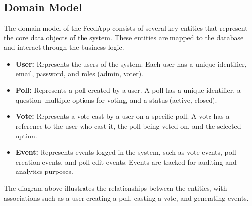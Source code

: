 \subsection{Domain Model}
The domain model of the FeedApp consists of several key entities that represent the core data objects of the system. These entities are mapped to the database and interact through the business logic.
\begin{itemize}
    \item \textbf{User:} Represents the users of the system. Each user has a unique identifier, email, password, and roles (admin, voter).
    \item \textbf{Poll:} Represents a poll created by a user. A poll has a unique identifier, a question, multiple options for voting, and a status (active, closed).
    \item \textbf{Vote:} Represents a vote cast by a user on a specific poll. A vote has a reference to the user who cast it, the poll being voted on, and the selected option.
    \item \textbf{Event:} Represents events logged in the system, such as vote events, poll creation events, and poll edit events. Events are tracked for auditing and analytics purposes.
\end{itemize}
The diagram above illustrates the relationships between the entities, with associations such as a user creating a poll, casting a vote, and generating events.
